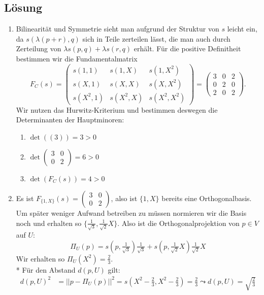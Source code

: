 \subsection{Lösung}
\begin{enumerate}
	\item Bilinearität und Symmetrie sieht man aufgrund der Struktur von \( s \) leicht ein, da \( s(\lambda(p+r),q) \) sich in Teile zerteilen lässt, die man auch durch Zerteilung von \( \lambda s(p,q) + \lambda s(r,q) \) erhält. Für die positive Definitheit bestimmen wir die Fundamentalmatrix
		\begin{equation*}
			F_C(s) = \left( \begin{smallmatrix}
				s(1,1) & s(1,X) & s(1,X^2) \\
				s(X,1) & s(X,X) & s(X,X^2) \\
				s(X^2,1) & s(X^2,X) & s(X^2,X^2)
			\end{smallmatrix} \right) = \begin{pmatrix}
				3 & 0 & 2 \\
				0 & 2 & 0 \\
				2 & 0 & 2
			\end{pmatrix}\text{.}
		\end{equation*}
		Wir nutzen das Hurwitz-Kriterium und bestimmen deswegen die Determinanten der Hauptminoren:
		\begin{enumerate}
			\item \( \det((3)) = 3 > 0 \) \\
			\item \( \det\left( \begin{smallmatrix}
				3 & 0 \\
				0 & 2
			\end{smallmatrix} \right) = 6 > 0 \)
			\item \( \det(F_C(s)) = 4 > 0 \)
		\end{enumerate}
	\item Es ist \( F_{\{ 1,X \}}(s) = \left( \begin{smallmatrix}
		3 & 0 \\
		0 & 2
	\end{smallmatrix} \right) \), also ist \( \{ 1,X \} \) bereits eine Orthogonalbasis. Um später weniger Aufwand betreiben zu müssen normieren wir die Basis noch und erhalten so \( \{ \tfrac{1}{\sqrt{3}}, \tfrac{1}{\sqrt{2}}X \} \).
	Also ist die Orthogonalprojektion von \( p \in V \) auf \( U \):
	\begin{equation*}
		\Pi_U(p) = s(p,\tfrac{1}{\sqrt{3}})\tfrac{1}{\sqrt{3}} + s(p,\tfrac{1}{\sqrt{2}}X)\tfrac{1}{\sqrt{2}}X
	\end{equation*}
	Wir erhalten so \( \Pi_U(X^2) = \tfrac{2}{3} \).
	\\*
	Für den Abstand \( d(p,U) \) gilt:
	\begin{align*}
		d(p,U)^2 &= ||p-\Pi_U(p)||^2 = s(X^2-\tfrac{2}{3},X^2-\tfrac{2}{3}) = \tfrac{2}{3} \leadsto d(p,U) = \sqrt{\tfrac{2}{3}}
	\end{align*}


\end{enumerate}
